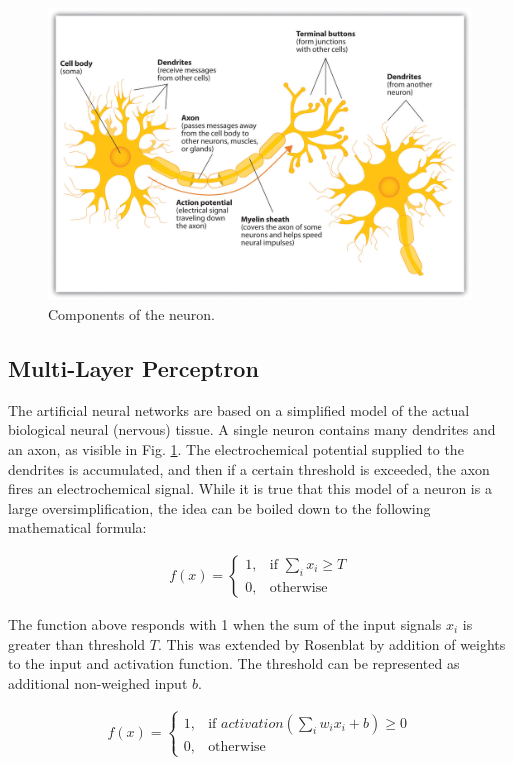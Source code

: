 \begin{figure}
  \centering
  \includegraphics[width=0.7\linewidth]{figures/chapter3/Components_of_neuron.jpg}
  \caption[neron]{Components of the neuron\footnotemark. }
  \label{fig:real_neuron}
\end{figure}


\subsection{Multi-Layer Perceptron}

The artificial neural networks are based on a simplified model of the actual biological neural (nervous) tissue. 
A single neuron contains many dendrites and an axon, as visible in Fig. \ref{fig:real_neuron}.
The electrochemical potential supplied to the dendrites is accumulated, and then if a certain threshold is exceeded, the axon fires an electrochemical signal.
While it is true that this model of a neuron is a large oversimplification, the idea can be boiled down to the following mathematical formula:

\begin{align*}
f(x)=
\begin{cases}
    1,& \text{if } \sum_{i} x_{i} \geq T \\
    0,              & \text{otherwise}
\end{cases}
\end{align*}

The function above responds with 1 when the sum of the input signals $x_{i}$ is greater than threshold $T$.
This was extended by Rosenblat by addition of weights to the input and activation function.
The threshold can be represented as additional non-weighed input $b$.

\begin{align*}
f(x)=
\begin{cases}
    1,& \text{if } activation(\sum_{i} w_{i}x_{i} + b) \geq 0 \\
    0,              & \text{otherwise}
\end{cases}
\end{align*}

